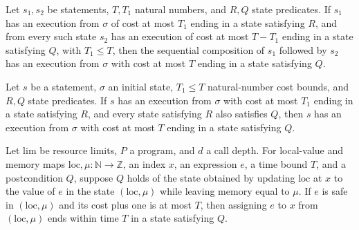\begin{theorem}
\label{Light.Ends.pieceThen}
\leanok
{}
Let $s_1,s_2$ be statements, $T,T_1$ natural numbers, and $R,Q$ state predicates. If
$s_1$ has an execution from $\sigma$ of cost at most $T_1$ ending in a state satisfying
$R$, and from every such state $s_2$ has an execution of cost at most $T-T_1$ ending in
a state satisfying $Q$, with $T_1\le T$, then the sequential composition of $s_1$
followed by $s_2$ has an execution from $\sigma$ with cost at most $T$ ending in a state
satisfying $Q$.
\end{theorem}

\begin{theorem}
\label{Light.Ends.pieceLast}
\leanok
{}
Let $s$ be a statement, $\sigma$ an initial state, $T_1\le T$ natural-number cost
bounds, and $R,Q$ state predicates. If $s$ has an execution from $\sigma$ with cost at
most $T_1$ ending in a state satisfying $R$, and every state satisfying $R$ also
satisfies $Q$, then $s$ has an execution from $\sigma$ with cost at most $T$ ending in a
state satisfying $Q$.
\end{theorem}

\begin{theorem}
\label{Light.Ends.setLast}
\leanok
{}
Let $\mathrm{lim}$ be resource limits, $P$ a program, and $d$ a call depth. For
local-value and memory maps $\mathrm{loc},\mu:\mathbb{N}\to\mathbb{Z}$, an index $x$, an
expression $e$, a time bound $T$, and a postcondition $Q$, suppose $Q$ holds of the
state obtained by updating $\mathrm{loc}$ at $x$ to the value of $e$ in the state
$(\mathrm{loc},\mu)$ while leaving memory equal to $\mu$. If $e$ is safe in
$(\mathrm{loc},\mu)$ and its cost plus one is at most $T$, then assigning $e$ to $x$
from $(\mathrm{loc},\mu)$ ends within time $T$ in a state satisfying $Q$.
\end{theorem}

